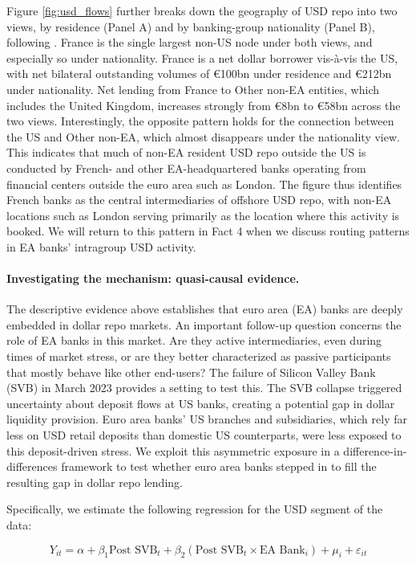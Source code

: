 \documentclass[english, 12pt, oneside]{article}
\begin{document}
Figure \ref{fig:usd_flows} further breaks down the geography of USD repo into two views, by residence (Panel A) and by banking-group nationality (Panel B), following \citet{mcguire2024}. France is the single largest non-US node under both views, and especially so under nationality. France is a net dollar borrower vis-à-vis the US, with net bilateral outstanding volumes of \euro 100bn under residence and \euro 212bn under nationality. Net lending from France to Other non-EA entities, which includes the United Kingdom, increases strongly from \euro 8bn to \euro 58bn across the two views. Interestingly, the opposite pattern holds for the connection between the US and Other non-EA, which almost disappears under the nationality view. This indicates that much of non-EA resident USD repo outside the US is conducted by French- and other EA-headquartered banks operating from financial centers outside the euro area such as London.
The figure thus identifies French banks as the central intermediaries of offshore USD repo, with non-EA locations such as London serving primarily as the location where this activity is booked. We will return to this pattern in Fact 4 when we discuss routing patterns in EA banks' intragroup USD activity.

\paragraph{Investigating the mechanism: quasi-causal evidence.}
The descriptive evidence above establishes that euro area (EA) banks are deeply embedded in dollar repo markets.
An important follow-up question concerns the role of EA banks in this market.
Are they active intermediaries, even during times of market stress, or are they better characterized as passive participants that mostly behave like other end-users? The failure of Silicon Valley Bank (SVB) in March 2023 provides a setting to test this. The SVB collapse triggered uncertainty about deposit flows at US banks, creating a potential gap in dollar liquidity provision. Euro area banks' US branches and subsidiaries, which rely far less on USD retail deposits than domestic US counterparts, were less exposed to this deposit-driven stress. We exploit this asymmetric exposure in a difference-in-differences framework to test whether euro area banks stepped in to fill the resulting gap in dollar repo lending.

Specifically, we estimate the following regression for the USD segment of the data:

\begin{equation}
Y_{it} = \alpha + \beta_1 \text{Post SVB}_t + \beta_2 (\text{Post SVB}_t \times \text{EA Bank}_i) + \mu_i + \varepsilon_{it}
\end{equation}
\end{document}
